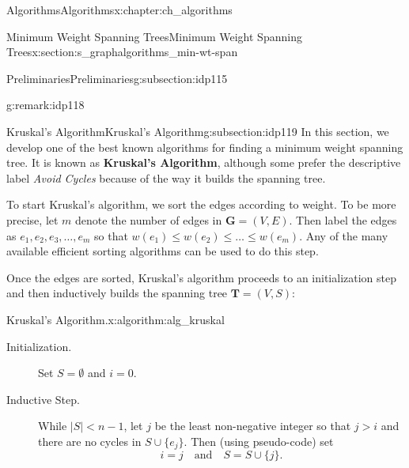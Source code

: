 \documentclass[oneside,10pt,]{book}
\newcommand{\terminology}[1]{\textbf{#1}}
\numberwithin{equation}{section}
\newcommand{\GVE}{\mathbf{G}=(V,E)}
\newcommand{\bfT}{\mathbf{T}}
\newcommand{\lt}{<}
\begin{document}
\begin{chapterptx}{Algorithms}{}{Algorithms}{}{}{x:chapter:ch_algorithms}
\begin{sectionptx}{Minimum Weight Spanning Trees}{}{Minimum Weight Spanning Trees}{}{}{x:section:s_graphalgorithms_min-wt-span}
\begin{subsectionptx}{Preliminaries}{}{Preliminaries}{}{}{g:subsection:idp115}
\begin{remark}{}{g:remark:idp118}
\end{remark}
\end{subsectionptx}
%
%
\typeout{************************************************}
\typeout{************************************************}
%
\begin{subsectionptx}{Kruskal's Algorithm}{}{Kruskal's Algorithm}{}{}{g:subsection:idp119}
In this section, we develop one of the best known algorithms for finding a minimum weight spanning tree. It is known as \terminology{Kruskal's Algorithm}, although some prefer the descriptive label \emph{Avoid Cycles} because of the way it builds the spanning tree.%
\par
To start Kruskal's algorithm, we sort the edges according to weight.  To be more precise, let \(m\) denote the number of edges in \(\GVE\).  Then label the edges as \(e_1,e_2,e_3,\dots,e_m\) so that \(w(e_1)\le w(e_2)\le \dots \le w(e_m)\). Any of the many available efficient sorting algorithms can be used to do this step.%
\par
Once the edges are sorted, Kruskal's algorithm proceeds to an initialization step and then inductively builds the spanning tree \(\bfT=(V,S)\):%
\begin{algorithm}{Kruskal's Algorithm.}{}{x:algorithm:alg_kruskal}%
%
%
%
\begin{description}
\item[{Initialization.}]Set \(S=\emptyset\) and \(i=0\).%
\item[{Inductive Step.}]While \(|S| \lt n-1\), let \(j\) be the least non-negative integer so that \(j > i\) and there are no cycles in \(S\cup\{e_j\}\). Then (using pseudo-code) set%
\begin{equation*}
i = j\quad\text{and} \quad S= S\cup\{j\}.
\end{equation*}
%
\end{description}
%
\end{algorithm}

\end{subsectionptx}
\end{sectionptx}
\end{chapterptx}
\end{document}
